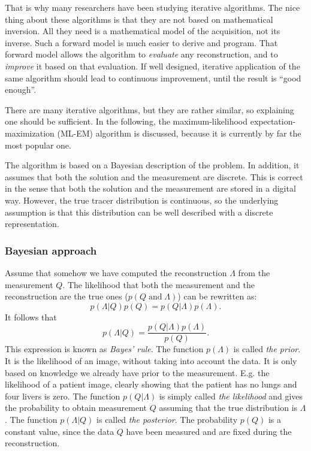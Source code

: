 That is why many researchers have been studying iterative algorithms. The nice
thing about these algorithms is that they are not based on mathematical
inversion.  All they need is a mathematical model of the acquisition, not its
inverse. Such a forward model is much easier to derive and program. That
forward model allows the algorithm to {\em evaluate} any reconstruction, and
to {\em improve} it based on that evaluation. If well designed, iterative
application of the same algorithm should lead to continuous improvement, until
the result is ``good enough''.

There are many iterative algorithms, but they are rather similar, so
explaining one should be sufficient. In the following, the maximum-likelihood
expectation-maximization (ML-EM) algorithm is discussed, because it is
currently by far the most popular one.

The algorithm is based on a Bayesian description of the problem. In
addition, it assumes that both the solution and the measurement are
discrete. This is correct in the sense that both the solution and the
measurement are stored in a digital way. However, the true tracer
distribution is continuous, so the underlying assumption is that this
distribution can be well described with a discrete representation.

\subsubsection{Bayesian approach} \label{sec:bayes}
Assume that somehow we have computed the reconstruction $\Lambda$ from the
measurement $Q$. The likelihood that both the measurement and the
reconstruction are the true ones ($p(Q \; \mbox{and} \; \Lambda)$) can be
rewritten as:
\begin{equation}
  p(\Lambda | Q) p(Q) = p(Q | \Lambda) p(\Lambda).
\end{equation}
It follows that
\begin{equation}
   p(\Lambda | Q) = \frac{p(Q | \Lambda) p(\Lambda)}{p(Q)}. \label{eq:jnpost}
\end{equation}
This expression is known as {\em Bayes' rule}. The function
$p(\Lambda)$ is called {\em the prior}. It is the likelihood of an
image, without taking into account the data. It is only based on
knowledge we already have prior to the measurement. E.g. the
likelihood of a patient image, clearly showing that the patient has no
lungs and four livers is zero. The function $p(Q | \Lambda)$ is simply
called {\em the likelihood} and gives the probability to obtain
measurement $Q$ assuming that the true distribution is $\Lambda$. The
function $p(\Lambda | Q)$ is called {\em the posterior}. The
probability $p(Q)$ is a constant value, since the data $Q$ have been
measured and are fixed during the reconstruction.

